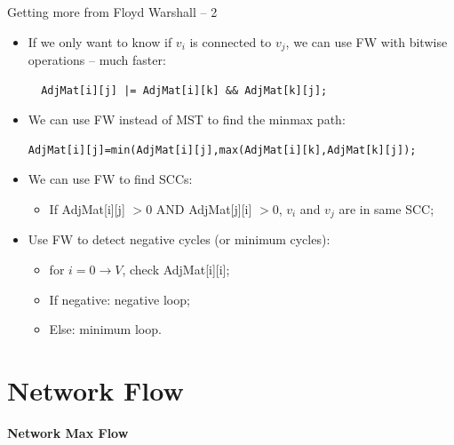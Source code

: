 \begin{frame}[fragile]{Getting more from Floyd Warshall -- 2}

  \begin{itemize}
  \item If we only want to know if $v_i$ is connected to $v_j$, we can use FW with bitwise operations -- much faster:
  \begin{verbatim}
  AdjMat[i][j] |= AdjMat[i][k] && AdjMat[k][j];
  \end{verbatim}

  \item We can use FW instead of MST to find the minmax path:
  {\smaller\begin{verbatim}
AdjMat[i][j]=min(AdjMat[i][j],max(AdjMat[i][k],AdjMat[k][j]);
\end{verbatim}}\medskip

  \item We can use FW to find SCCs:
  \begin{itemize}
    \item If AdjMat[i][j] $> 0$ AND AdjMat[j][i] $> 0$, $v_i$ and $v_j$ are in same SCC;
  \end{itemize}\medskip

  \item Use FW to detect negative cycles (or minimum cycles):
  \begin{itemize}
    \item for $i = 0\to V$, check AdjMat[i][i];
    \item If negative: negative loop;
    \item Else: minimum loop.
  \end{itemize}
  \end{itemize}
\end{frame}

\section{Network Flow}

\begin{frame}
  \begin{center}
    {\bf Network Max Flow}
  \end{center}
\end{frame}

